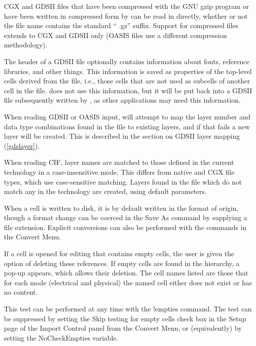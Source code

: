 CGX and GDSII files that have been compressed with the GNU {\et gzip}
program or have been written in compressed form by {\Xic} can be read
in directly, whether or not the file name contains the standard ``{\vt
.gz}'' suffix.  Support for compressed files extends to CGX and GDSII
only (OASIS files use a different compression methodology).

The header of a GDSII file optionally contains information about
fonts, reference libraries, and other things.  This information is
saved as properties of the top-level cells derived from the file,
i.e., those cells that are not used as subcells of another cell in the
file.  {\Xic} does not use this information, but it will be put back
into a GDSII file subsequently written by {\Xic}, as other
applications may need this information.

When reading GDSII or OASIS input, {\Xic} will attempt to map the
layer number and data type combinations found in the file to existing
{\Xic} layers, and if that fails a new {\Xic} layer will be created. 
This is described in the section on GDSII layer mapping
(\ref{gdslayer}).

When reading CIF, layer names are matched to those defined in the
current technology in a case-insensitive mode.  This differs from
native and CGX file types, which use case-sensitive matching.  Layers
found in the file which do not match any in the technology are
created, using default parameters.

When a cell is written to disk, it is by default written in the format
of origin, though a format change can be coerced in the {\cb Save As}
command by supplying a file extension.  Explicit conversions can also
be performed with the commands in the {\cb Convert Menu}.

If a cell is opened for editing that contains empty cells, the user is
given the option of deleting these references.  If empty cells are
found in the hierarchy, a pop-up appears, which allows their deletion. 
The cell names listed are those that for each mode (electrical and
physical) the named cell either does not exist or has no content.

This test can be performed at any time with the {\cb !empties}
command.  The test can be suppressed by setting the {\cb Skip testing
for empty cells} check box in the {\cb Setup} page of the {\cb Import
Control} panel from the {\cb Convert Menu}, or (equivalently) by
setting the {\et NoCheckEmpties} variable.

